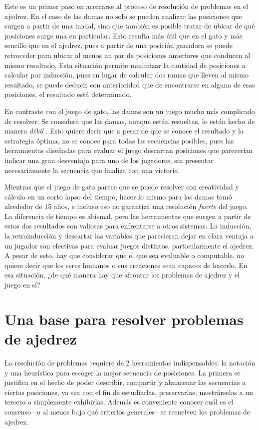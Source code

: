 \documentclass[twoside,openright,12pt,a4paper,spanish]{book}
\begin{document}
Este es un primer paso en acercarse al proceso de resoluci\'on de problemas en el ajedrez. En el caso de las damas no solo se pueden analizar las posiciones que surgen a partir de una inicial, sino que tambi\'en es posible tratar de ubicar de qué posiciones surge una en particular. Esto resulta m\'as \'util que en el gato y m\'as sencillo que en el ajedrez, pues a partir de una posici\'on ganadora se puede retroceder para ubicar al menos un par de posiciones anteriores que conducen al mismo resultado. Esta situaci\'on permite minimizar la cantidad de posiciones a calcular por inducci\'on, pues en lugar de calcular dos ramas que lleven al mismo resultado, se puede deducir con anterioridad que de encontrarse en alguna de esas posiciones, el resultado est\'a determinado.

En contraste con el juego de gato, las damas son un juego mucho m\'as complicado de resolver. Se considera que las damas, aunque están resueltas, lo están hecho de manera \emph{d\'ebil} \cite[p. 1518]{schaeffer2007checkers}. Esto quiere decir que a pesar de que se conoce el resultado y la estrategia \'optima, no se conoce para todas las secuencias posibles, pues las herramientas diseñadas para evaluar el juego descartan posiciones que parecer\'ian indicar una gran desventaja para uno de los jugadores, sin presentar necesariamente la secuencia que finaliza con una victoria. 

Mientras que el juego de gato parece que se puede resolver con creatividad y c\'alculo en un corto lapso del tiempo, hacer lo mismo para las damas tom\'o alrededor de 15 años, e incluso eso no garantiza una resoluci\'on \emph{fuerte} del juego. La diferencia de tiempo es abismal, pero las herramientas que surgen a partir de estos dos resultados son valiosas para enfrentarse a otros sistemas. La inducci\'on, la retroinducci\'on y descartar las variables que parecieran dejar en clara ventaja a un jugador son efectivas para evaluar juegos distintos, particularmente el ajedrez. A pesar de esto, hay que considerar que el que sea evaluable o computable, no quiere decir que los seres humanos o sus creaciones sean capaces de hacerlo. En esa situaci\'on, ¿de qu\'e manera hay que afrontar los problemas de ajedrez y el juego en s\'i?

\section{Una base para resolver problemas de ajedrez}

\noindent La resolución de problemas requiere de 2 herramientas indispensables: la notación y una heurística para escoger la mejor secuencia de posiciones. La primera se justifica en el hecho de poder describir, compartir y almacenar las secuencias a ciertas posiciones, ya sea con el fin de estudiarlas, preservarlas, mostrárselas a un tercero o simplemente exhibirlas. Además es conveniente conocer cuál es el consenso --o al menos bajo qué criterios generales-- se resuelven los problemas de ajedrez.
\end{document}
